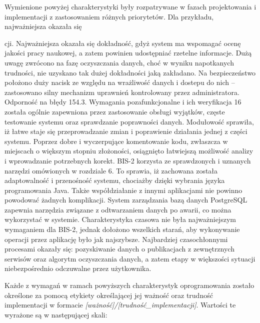 Wymienione powyżej charakterystyki były rozpatrywane w fazach projektowania i implementacji z zastosowaniem różnych priorytetów. Dla przykładu, najważniejsza okazała się %

cji.
Najważniejsza okazała się dokładność, gdyż system ma wspomagać ocenę jakości pracy naukowej, a zatem powinien udostępniać rzetelne informacje. Dużą uwagę zwrócono na fazę oczyszczania
danych, choć w wyniku napotkanych trudności, nie uzyskano tak dużej dokładności jaką zakładano.
Na bezpieczeństwo położono duży nacisk ze względu na wrażliwość danych i dostepu do nich –
zastosowano silny mechanizm uprawnień kontrolowany przez administratora. Odporność na błędy
154.3. Wymagania pozafunkcjonalne i ich weryﬁkacja 16
została ogólnie zapewniona przez zastosowanie obsługi wyjątków, częste testowanie systemu oraz
sprawdzanie poprawności danych.
Modułowość sprawiła, iż łatwe staje się przeprowadzanie zmian i poprawienie działania jednej
z części systemu. Poprzez dobre i wyczerpujące komentowanie kodu, zwłaszcza w miejscach o
większym stopniu złożoności, osiągnięto łatwiejszą możliwość analizy i wprowadzanie potrzebnych
korekt.
BIS-2 korzysta ze sprawdzonych i uznanych narzędzi omówionych w rozdziale 6. To sprawia,
iż zachowana została adaptowalność i przenośność systemu, chociażby dzięki wybrania języka programowania Java. Także współdziałanie z innymi aplikacjami nie powinno powodować żadnych
komplikacji. System zarządzania bazą danych PostgreSQL zapewnia narzędzia związane z odtwarzaniem danych po awarii, co można wykorzystać w systemie. Charakterystyka czasowa nie
była najważniejszym wymaganiem dla BIS-2, jednak dołożono wszelkich starań, aby wykonywanie
operacji przez aplikację było jak najszybsze. Najbardziej czasochłonnymi procesami okazały się:
pozyskiwanie danych o publikacjach z zewnętrznych serwisów oraz algorytm oczyszczania danych,
a zatem etapy w większości sytuacji niebezpośrednio odczuwalne przez użytkownika.

Każde z wymagań w ramach powyższych charakterystyk oprogramowania zostało określone za pomocą etykiety określającej jej ważność oraz trudność implementacji w formacie \textit{[ważność]/[trudność_implementacji]}. Wartości te wyrażone są w następującej skali:
\begin{itemize}
\item{H (ang.~) -- wysoka;
\item{M (ang.~) -- średnia;
\item{L (ang.~) -- niska.
\end{itemize}

